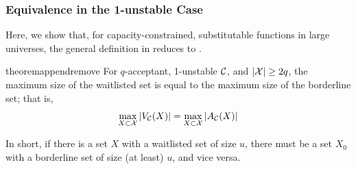 \subsubsection{Equivalence in the 1-unstable Case} \label{sec:var-proof}

Here, we show that, for capacity-constrained, substitutable functions in large universes, the general definition in  reduces to .

\begin{restatable}{theorem}{appendremove}
\label{thm:append-remove-size}
For $q$-acceptant, 1-unstable $\mathcal{C}$, and $|\mathcal{X}| \geq 2q$, the maximum size of the waitlisted set is equal to the maximum size of the borderline set; that is,
\begin{equation}
\max_{X\subset \mathcal{X}} \left| V_{\mathcal{C}}(X)\right| = \max_{X\subset \mathcal{X}} \left| A_{\mathcal{C}}(X)\right|
\end{equation}
\end{restatable}

In short, if there is a set $X$ with a waitlisted set of size $u$, there must be a set $X_0$ with a borderline set of size (at least) $u$, and vice versa. %

